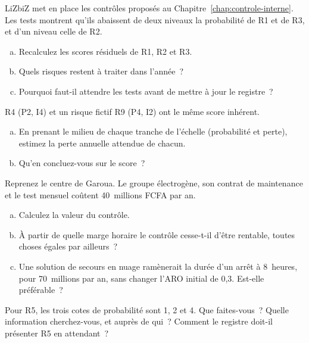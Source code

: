 \begin{boxexo}[title={\ding{45}\quad Exercice~4.3. Après les contrôles \niveaumoyen}]
LiZbiZ met en place les contrôles proposés au Chapitre~\ref{chap:controle-interne}.
Les tests montrent qu'ils abaissent de deux niveaux la probabilité de R1 et
de R3, et d'un niveau celle de R2.
\begin{enumerate}[(a)]
    \item Recalculez les scores résiduels de R1, R2 et R3.
    \item Quels risques restent à traiter dans l'année~?
    \item Pourquoi faut-il attendre les tests avant de mettre à jour le
          registre~?
\end{enumerate}
\end{boxexo}

\begin{boxexo}[title={\ding{45}\quad Exercice~4.4. Deux risques de score 8 \niveaumoyen}]
R4 (P2, I4) et un risque fictif R9 (P4, I2) ont le même score inhérent.
\begin{enumerate}[(a)]
    \item En prenant le milieu de chaque tranche de l'échelle (probabilité
          et perte), estimez la perte annuelle attendue de chacun.
    \item Qu'en concluez-vous sur le score~?
\end{enumerate}
\end{boxexo}

\begin{boxexo}[title={\ding{45}\quad Exercice~4.5. La valeur d'un contrôle \niveaumoyen}]
Reprenez le centre de Garoua. Le groupe électrogène, son contrat de
maintenance et le test mensuel coûtent 40~millions FCFA par an.
\begin{enumerate}[(a)]
    \item Calculez la valeur du contrôle.
    \item À partir de quelle marge horaire le contrôle cesse-t-il d'être
          rentable, toutes choses égales par ailleurs~?
    \item Une solution de secours en nuage ramènerait la durée d'un arrêt
          à 8~heures, pour 70~millions par an, sans changer l'ARO initial
          de 0,3. Est-elle préférable~?
\end{enumerate}
\end{boxexo}

\begin{boxexo}[title={\ding{45}\quad Exercice~4.6. Trois évaluateurs \niveaumoyen}]
Pour R5, les trois cotes de probabilité sont 1, 2 et 4. Que faites-vous~?
Quelle information cherchez-vous, et auprès de qui~? Comment le registre
doit-il présenter R5 en attendant~?
\end{boxexo}

